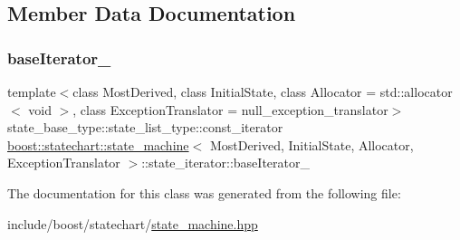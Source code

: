 \subsection{Member Data Documentation}
\mbox{\label{classboost_1_1statechart_1_1state__machine_1_1state__iterator_a96e8b4cbbc04c007795d4b4113d63e4c}} 
\subsubsection{\texorpdfstring{base\+Iterator\+\_\+}{baseIterator\_}}
{\footnotesize\ttfamily template$<$class Most\+Derived, class Initial\+State, class Allocator = std\+::allocator$<$ void $>$, class Exception\+Translator = null\+\_\+exception\+\_\+translator$>$ \\
state\+\_\+base\+\_\+type\+::state\+\_\+list\+\_\+type\+::const\+\_\+iterator \mbox{\hyperlink{classboost_1_1statechart_1_1state__machine}{boost\+::statechart\+::state\+\_\+machine}}$<$ Most\+Derived, Initial\+State, Allocator, Exception\+Translator $>$\+::state\+\_\+iterator\+::base\+Iterator\+\_\+\hspace{0.3cm}{\ttfamily [private]}}



The documentation for this class was generated from the following file\+:\begin{DoxyCompactItemize}
\item 
include/boost/statechart/\mbox{\hyperlink{state__machine_8hpp}{state\+\_\+machine.\+hpp}}\end{DoxyCompactItemize}
